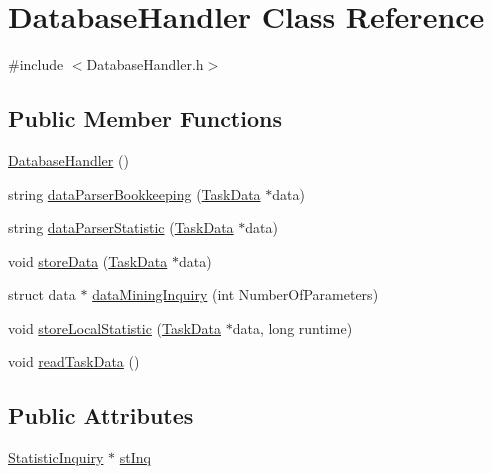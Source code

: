 \hypertarget{class_database_handler}{}\section{Database\+Handler Class Reference}
\label{class_database_handler}


{\ttfamily \#include $<$Database\+Handler.\+h$>$}

\subsection*{Public Member Functions}
\begin{DoxyCompactItemize}
\item 
\hyperlink{class_database_handler_ac27357d3431faf4fd6810483a24a43fd}{Database\+Handler} ()
\item 
string \hyperlink{class_database_handler_acb8ccbee3347b22557108ccd1b58de08}{data\+Parser\+Bookkeeping} (\hyperlink{_types_8h_a4ae72f8dd090186bad5e816fd1bf4fb5}{Task\+Data} $\ast$data)
\item 
string \hyperlink{class_database_handler_a97f7f624920dbce0dc8d388faff2d370}{data\+Parser\+Statistic} (\hyperlink{_types_8h_a4ae72f8dd090186bad5e816fd1bf4fb5}{Task\+Data} $\ast$data)
\item 
void \hyperlink{class_database_handler_af0f1d44b27165b6737433e6750b6aa1e}{store\+Data} (\hyperlink{_types_8h_a4ae72f8dd090186bad5e816fd1bf4fb5}{Task\+Data} $\ast$data)
\item 
struct data $\ast$ \hyperlink{class_database_handler_a6cd3f020e04dba3a666a54c6b80e81a7}{data\+Mining\+Inquiry} (int Number\+Of\+Parameters)
\item 
void \hyperlink{class_database_handler_a7e67913b3d03bbc407b9a8fa7cbabf0e}{store\+Local\+Statistic} (\hyperlink{_types_8h_a4ae72f8dd090186bad5e816fd1bf4fb5}{Task\+Data} $\ast$data, long runtime)
\item 
void \hyperlink{class_database_handler_a320b7f44af4b03225c4b6f9eaec568d0}{read\+Task\+Data} ()
\end{DoxyCompactItemize}
\subsection*{Public Attributes}
\begin{DoxyCompactItemize}
\item 
\hyperlink{_types_8h_a533ab00ede804a96e4334224c57ba59e}{Statistic\+Inquiry} $\ast$ \hyperlink{class_database_handler_acb152e98fa5b111b16e22f4a5b896756}{st\+Inq}
\end{DoxyCompactItemize}



